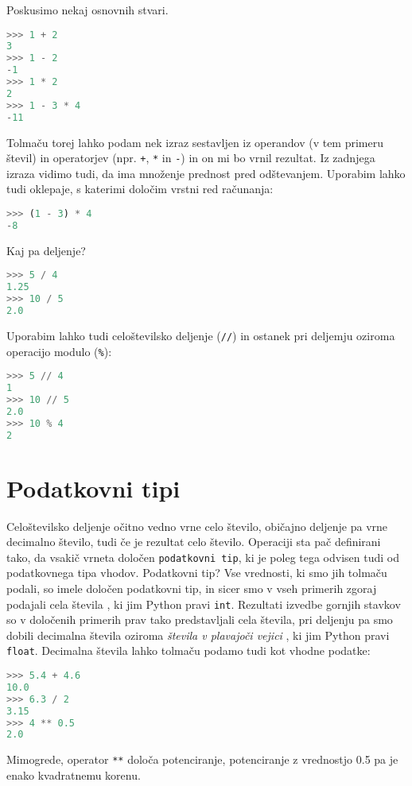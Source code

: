 Poskusimo nekaj osnovnih stvari.
\begin{lstlisting}[language=Python, showstringspaces=false]
>>> 1 + 2
3
>>> 1 - 2
-1
>>> 1 * 2
2
>>> 1 - 3 * 4
-11
\end{lstlisting}
Tolmaču torej lahko podam nek izraz sestavljen iz operandov (v tem primeru števil) in operatorjev (npr. \texttt{+}, \texttt{*} in \texttt{-}) in on mi bo vrnil rezultat. Iz zadnjega izraza vidimo tudi, da ima množenje prednost pred odštevanjem. Uporabim lahko tudi oklepaje, s katerimi določim vrstni red računanja:
\begin{lstlisting}[language=Python, showstringspaces=false]
>>> (1 - 3) * 4
-8
\end{lstlisting}
Kaj pa deljenje? 
\begin{lstlisting}[language=Python, showstringspaces=false]
>>> 5 / 4
1.25
>>> 10 / 5
2.0
\end{lstlisting}
Uporabim lahko tudi celoštevilsko deljenje (\texttt{//}) in ostanek pri deljemju oziroma operacijo modulo (\texttt{\%}): 
\begin{lstlisting}[language=Python, showstringspaces=false]
>>> 5 // 4
1
>>> 10 // 5
2.0
>>> 10 % 4
2
\end{lstlisting}

\section{Podatkovni tipi}

Celoštevilsko deljenje očitno vedno vrne celo število, običajno deljenje pa vrne decimalno število, tudi če je rezultat celo število. Operaciji sta pač definirani tako, da vsakič vrneta določen \texttt{podatkovni tip}, ki je poleg tega odvisen tudi od podatkovnega tipa vhodov. Podatkovni tip? Vse vrednosti, ki smo jih tolmaču podali, so imele določen podatkovni tip, in sicer smo v vseh primerih zgoraj podajali cela števila , ki jim Python pravi \texttt{int}. Rezultati izvedbe gornjih stavkov so v določenih primerih prav tako predstavljali cela števila, pri deljenju pa smo dobili decimalna števila oziroma \emph{števila v plavajoči vejici} , ki jim Python pravi \texttt{float}. Decimalna števila lahko tolmaču podamo tudi kot vhodne podatke:
\begin{lstlisting}[language=Python, showstringspaces=false]
>>> 5.4 + 4.6
10.0
>>> 6.3 / 2
3.15
>>> 4 ** 0.5
2.0
\end{lstlisting}
Mimogrede, operator \texttt{**} določa potenciranje, potenciranje z vrednostjo 0.5 pa je enako kvadratnemu korenu. 

